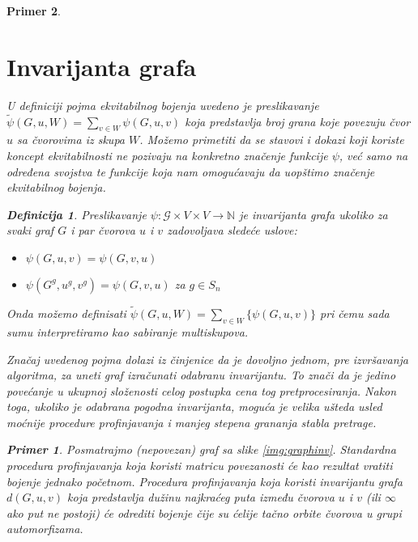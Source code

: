 \documentclass[12pt,oneside]{memoir}
\newtheorem{example}{Primer}
\theoremstyle{definition}
\newtheorem*{definition}{Definicija}
\begin{document}
\begin{example}
 \section{Invarijanta grafa}

  U definiciji pojma ekvitabilnog bojenja uvedeno je preslikavanje
  $\widetilde{\psi}(G, u, W) = \sum_{v \in W} \psi(G, u, v)$ koja predstavlja
  broj grana koje povezuju čvor $u$ sa čvorovima iz skupa $W$. Možemo primetiti
  da se stavovi i dokazi koji koriste koncept ekvitabilnosti ne pozivaju na
  konkretno značenje funkcije $\psi$, već samo na određena svojstva te funkcije
  koja nam omogućavaju da uopštimo značenje ekvitabilnog bojenja.

  \begin{definition}
	  Preslikavanje $\psi : \mathcal{G} \times V \times V \to \mathbb{N}$ je
	  \emph{invarijanta grafa} ukoliko za svaki graf $G$ i par čvorova $u$ i $v$
	  zadovoljava sledeće uslove:

	  \begin{itemize}
		  \item[($\psi1$)] $\psi(G, u, v) = \psi(G, v, u)$
		  \item[($\psi2$)] $\psi(G^g, u^g, v^g) = \psi(G, v, u)$ za $g \in S_n$
	  \end{itemize}
  \end{definition}

  Onda možemo definisati $\widetilde{\psi}(G, u, W) = \sum_{v \in W} \{\psi(G, u, v)\}$ pri
  čemu sada sumu interpretiramo kao sabiranje multiskupova.

  Značaj uvedenog pojma dolazi iz činjenice da je dovoljno jednom, pre
  izvršavanja algoritma, za uneti graf izračunati odabranu invarijantu. To
  znači da je jedino povećanje u ukupnoj složenosti celog postupka cena tog
  pretprocesiranja. Nakon toga, ukoliko je odabrana pogodna invarijanta, moguća
  je velika ušteda usled moćnije procedure profinjavanja i manjeg stepena
  grananja stabla pretrage.

  \begin{example}
	  \label{ex:graphinv}
	  Posmatrajmo (nepovezan) graf sa slike \ref{img:graphinv}. Standardna
	  procedura profinjavanja koja koristi matricu povezanosti će kao rezultat
	  vratiti bojenje jednako početnom. Procedura profinjavanja koja koristi
	  invarijantu grafa $d(G, u, v)$ koja predstavlja dužinu najkraćeg puta
	  između čvorova $u$ i $v$ (ili $\infty$ ako put ne postoji) će odrediti
	  bojenje čije su ćelije tačno orbite čvorova u grupi automorfizama.
  \end{example}


\end{example}
\end{document}
